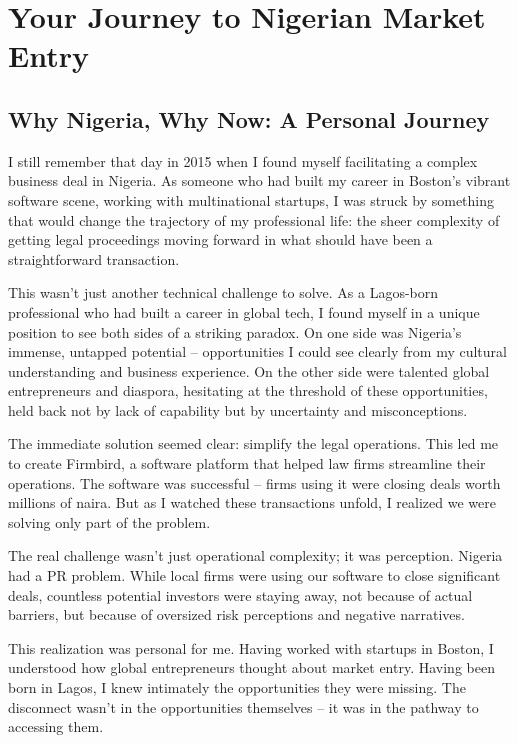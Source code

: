 \chapter*{Your Journey to Nigerian Market Entry}

\section{Why Nigeria, Why Now: A Personal Journey}\label{sec:why-nigeria-why-now}

I still remember that day in 2015 when I found myself facilitating a complex business deal in Nigeria. As someone who had built my career in Boston's vibrant software scene, working with multinational startups, I was struck by something that would change the trajectory of my professional life: the sheer complexity of getting legal proceedings moving forward in what should have been a straightforward transaction.

This wasn't just another technical challenge to solve. As a Lagos-born professional who had built a career in global tech, I found myself in a unique position to see both sides of a striking paradox. On one side was Nigeria's immense, untapped potential – opportunities I could see clearly from my cultural understanding and business experience. On the other side were talented global entrepreneurs and diaspora, hesitating at the threshold of these opportunities, held back not by lack of capability but by uncertainty and misconceptions.

The immediate solution seemed clear: simplify the legal operations. This led me to create Firmbird, a software platform that helped law firms streamline their operations. The software was successful – firms using it were closing deals worth millions of naira. But as I watched these transactions unfold, I realized we were solving only part of the problem.

The real challenge wasn't just operational complexity; it was perception. Nigeria had a PR problem. While local firms were using our software to close significant deals, countless potential investors were staying away, not because of actual barriers, but because of oversized risk perceptions and negative narratives.

This realization was personal for me. Having worked with startups in Boston, I understood how global entrepreneurs thought about market entry. Having been born in Lagos, I knew intimately the opportunities they were missing. The disconnect wasn't in the opportunities themselves – it was in the pathway to accessing them.

